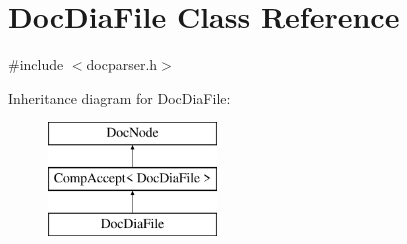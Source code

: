 \hypertarget{class_doc_dia_file}{}\section{Doc\+Dia\+File Class Reference}
\label{class_doc_dia_file}


{\ttfamily \#include $<$docparser.\+h$>$}

Inheritance diagram for Doc\+Dia\+File\+:\begin{figure}[H]
\begin{center}
\leavevmode
\includegraphics[height=3.000000cm]{class_doc_dia_file}
\end{center}
\end{figure}
